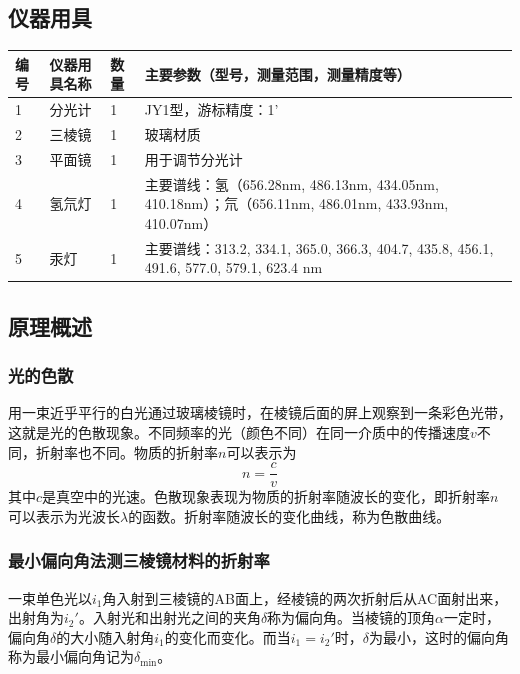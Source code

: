 \documentclass[dvipsnames, svgnames,a4paper,11pt]{article}
\begin{document}
\subsection{仪器用具}
\begin{table}[htbp]
	\centering
	\renewcommand\arraystretch{1.6}
	\begin{tabular}{p{}|p{}|p{}|p{}}
	\hline
	编号& 仪器用具名称 & 数量 &  主要参数（型号，测量范围，测量精度等） \\
	\hline
	1 & 分光计 & 1 & JY1型，游标精度：1' \\
	
	2 & 三棱镜 & 1 & 玻璃材质 \\
	
	3 & 平面镜 & 1 & 用于调节分光计 \\
	
	4 & 氢氘灯 & 1 & 主要谱线：氢（656.28nm, 486.13nm, 434.05nm, 410.18nm）；氘（656.11nm, 486.01nm, 433.93nm, 410.07nm） \\
	
	5 & 汞灯 & 1 & 主要谱线：313.2, 334.1, 365.0, 366.3, 404.7, 435.8, 456.1, 491.6, 577.0, 579.1, 623.4 nm \\
	\hline
\end{tabular}
\end{table}

\subsection{原理概述}

\subsubsection{光的色散}
用一束近乎平行的白光通过玻璃棱镜时，在棱镜后面的屏上观察到一条彩色光带，这就是光的色散现象。不同频率的光（颜色不同）在同一介质中的传播速度$v$不同，折射率也不同。物质的折射率$n$可以表示为
\begin{equation}
	n = \frac{c}{v}
\end{equation}
其中$c$是真空中的光速。色散现象表现为物质的折射率随波长的变化，即折射率$n$可以表示为光波长$\lambda$的函数。折射率随波长的变化曲线，称为色散曲线。

\subsubsection{最小偏向角法测三棱镜材料的折射率}
一束单色光以$i_1$角入射到三棱镜的AB面上，经棱镜的两次折射后从AC面射出来，出射角为$i_2'$。入射光和出射光之间的夹角$\delta$称为偏向角。当棱镜的顶角$\alpha$一定时，偏向角$\delta$的大小随入射角$i_1$的变化而变化。而当$i_1=i_2'$时，$\delta$为最小，这时的偏向角称为最小偏向角记为$\delta_{\min}$。
\end{document}
